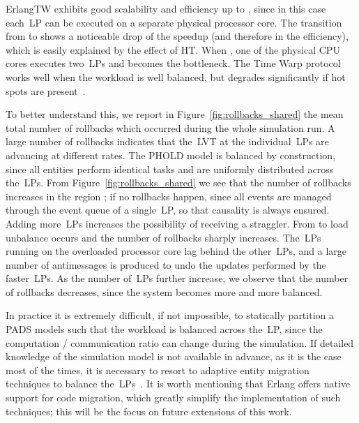 \documentclass{sigplanconf}
\begin{document}
ErlangTW exhibits good scalability and efficiency up to , since
in this case each~\ac{LP} can be executed on a separate physical
processor core. The transition from  to  shows a noticeable
drop of the speedup (and therefore in the efficiency), which is easily
explained by the effect of HT. When , one of the physical CPU
cores executes two~\acp{LP} and becomes the bottleneck. The Time Warp
protocol works well when the workload is well balanced, but degrades
significantly if hot spots are present~\cite{Carothers2000}.

To better understand this, we report in
Figure~\ref{fig:rollbacks_shared} the mean total number of rollbacks
which occurred during the whole simulation run. A large number of
rollbacks indicates that the~\ac{LVT} at the individual~\acp{LP} are
advancing at different rates. The PHOLD model is
balanced by construction, since all entities perform identical tasks
and are uniformly distributed across the~\acp{LP}. From
Figure~\ref{fig:rollbacks_shared} we see that the number of rollbacks
increases in the region ; if  no rollbacks
happen, since all events are managed through the event queue of a
single~\ac{LP}, so that causality is always ensured.  Adding
more~\acp{LP} increases the possibility of receiving a straggler. From
 to  load unbalance occurs and the number of rollbacks
sharply increases. The~\acp{LP} running on the overloaded processor
core lag behind the other~\acp{LP}, and a large number of antimessages
is produced to undo the updates performed by the faster~\acp{LP}.  As
the number of~\acp{LP} further increase, we observe that the number of
rollbacks decreases, since the system becomes more and more balanced.

In practice it is extremely difficult, if not impossible, to
statically partition a \ac{PADS} models such that the workload is
balanced across the~\ac{LP}, since the computation / communication
ratio can change during the simulation. If detailed knowledge of the
simulation model is not available in advance, as it is the case most
of the times, it is necessary to resort to adaptive entity migration
techniques to balance the~\acp{LP}~\cite{gda-ijspm-2009}. It is worth mentioning that
Erlang offers native support for code migration, which greatly
simplify the implementation of such techniques; this will be the focus
on future extensions of this work.

\begin{figure*}[ht]
\centering {}
\caption{Speedup on the distributed memory cluster as a function of the number of LPs (higher is better); the~\ac{GVT} is computed every 5 of wall clock time}\label{fig:speedup_distributed_5s}
\end{figure*}
\end{document}
